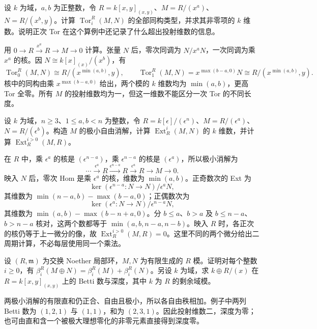\begin{exercise}\label{b3:ex:17-tor-choice-matters}
	设 \(k\) 为域，\(a,b\) 为正整数，令 \(R=k[x,y]_{(x,y)}\)、\(M=R/(x^a)\)、\(N=R/(x^b,y)\)。计算 \(\operatorname{Tor}_i^R(M,N)\) 的全部同构类型，并求其非零项的 \(k\) 维数。说明正次 Tor 在这个算例中还记录了什么超出投射维数的信息。
\end{exercise}
\begin{solution}
	用 \(0\to R\xrightarrow{x^a}R\to M\to0\) 计算。张量 \(N\) 后，零次同调为 \(N/x^aN\)，一次同调为乘 \(x^a\) 的核。因 \(N\cong k[x]_{(x)}/(x^b)\)，有
	\[
		\operatorname{Tor}_0^R(M,N)\cong R/(x^{\min(a,b)},y),\qquad \operatorname{Tor}_1^R(M,N)=x^{\max(b-a,0)}N \cong R/(x^{\min(a,b)},y).
	\]
	核中的同构由乘 \(x^{\max(b-a,0)}\) 给出，两个模的 \(k\) 维数均为 \(\min(a,b)\)，更高 Tor 全零。所有 \(M\) 的投射维数均为一，但这一维数不能区分一次 Tor 的不同长度。
\end{solution}

\begin{exercise}\label{b3:ex:17-dual-number-ext}
	设 \(k\) 为域，\(n\ge3\)、\(1\le a,b<n\) 为整数，令 \(R=k[\epsilon]/(\epsilon^n)\)、\(M=R/(\epsilon^a)\)、\(N=R/(\epsilon^b)\)。构造 \(M\) 的极小自由消解，计算 \(\operatorname{Ext}_R^i(M,N)\) 的 \(k\) 维数，并计算 \(\operatorname{Ext}_R^{i>0}(M,R)\)。
\end{exercise}
\begin{solution}
	在 \(R\) 中，乘 \(\epsilon^a\) 的核是 \((\epsilon^{n-a})\)，乘 \(\epsilon^{n-a}\) 的核是 \((\epsilon^a)\)，所以极小消解为
	\[
		\cdots\xrightarrow{\epsilon^a}R\xrightarrow{\epsilon^{n-a}}R \xrightarrow{\epsilon^a}R\longrightarrow M\longrightarrow0.
	\]
	映入 \(N\) 后，零次 Hom 是乘 \(\epsilon^a\) 的核，维数为 \(\min(a,b)\)。正奇数次的 Ext 为
	\[
		\ker(\epsilon^{n-a}:N\to N)/\epsilon^aN,
	\]
	其维数为 \(\min(n-a,b)-\max(b-a,0)\)；正偶数次为
	\[
		\ker(\epsilon^a:N\to N)/\epsilon^{n-a}N,
	\]
	其维数为 \(\min(a,b)-\max(b-n+a,0)\)。分 \(b\le a\)、\(b>a\) 及 \(b\le n-a\)、\(b>n-a\) 核对，这两个数都等于 \(\min(a,b,n-a,n-b)\)。映入 \(R\) 时，各正次的核仍等于上一微分的像，故 \(\operatorname{Ext}_R^{i>0}(M,R)=0\)。这里不同的两个微分给出二周期计算，不必每层使用同一个乘法。
\end{solution}

\begin{exercise}\label{b3:ex:17-direct-sum-betti}
	设 \((R,\mathfrak m)\) 为交换 Noether 局部环，\(M,N\) 为有限生成的 \(R\) 模。证明对每个整数 \(i\ge0\)，有 \(\beta_i^R(M\oplus N)=\beta_i^R(M)+\beta_i^R(N)\)。另设 \(k\) 为域，求 \(k\oplus R/(x)\) 在 \(R=k[x,y]_{(x,y)}\) 上的 Betti 数与深度，其中 \(k\) 为 \(R\) 的剩余域模。
\end{exercise}
\begin{solution}
	两极小消解的有限直和仍正合、自由且极小，所以各自由秩相加。例子中两列 Betti 数为 \((1,2,1)\) 与 \((1,1)\)，和为 \((2,3,1)\)。因此投射维数二，深度为零；也可由直和含一个被极大理想零化的非零元素直接得到深度零。
\end{solution}

